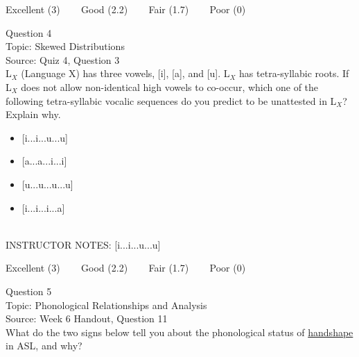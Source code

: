 \documentclass[12pt]{article}
\begin{document}
\vfill
Excellent (3) ~~~ Good (2.2) ~~~ Fair (1.7) ~~~ Poor (0)
\newpage

{\large Question 4}\\

Topic: Skewed Distributions\\
Source: Quiz 4, Question 3\\

L$_X$ (Language X) has three vowels, [i], [a], and [u]. L$_X$ has tetra-syllabic roots. If L$_X$ does not allow non-identical high vowels to co-occur, which one of the following tetra-syllabic vocalic sequences do you predict to be unattested in L$_X$? Explain why.\\

\begin{itemize} \item {[i...i...u...u]} \item {[a...a...i...i]} \item {[u...u...u...u]} \item {[i...i...i...a]} \end{itemize}


~\\
INSTRUCTOR NOTES: [i...i...u...u]


\vfill
Excellent (3) ~~~ Good (2.2) ~~~ Fair (1.7) ~~~ Poor (0)
\newpage

{\large Question 5}\\

Topic: Phonological Relationships and Analysis\\
Source: Week 6 Handout, Question 11\\

What do the two signs below tell you about the phonological status of \underline{handshape} in ASL, and why?\\
\end{document}
